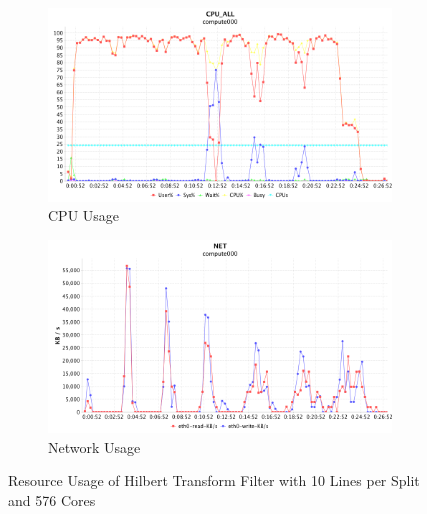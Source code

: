 \begin{figure}[!ht]
\centering
\begin{subfigure}{1\textwidth}
  \centering
  \includegraphics[width=1\linewidth]{figures/Htf10_576_CPU.png}
  \caption{CPU Usage}
  \label{Htf10_576_CPU}
\end{subfigure}
\begin{subfigure}{1\textwidth}
  \centering
  \includegraphics[width=1\linewidth]{figures/Htf10_576_NET.png}
  \caption{Network Usage}
  \label{Htf10_576_NET}
\end{subfigure}
\caption{Resource Usage of Hilbert Transform Filter with 10 Lines per Split and 576 Cores}
\label{Htf10_576}
\end{figure}

